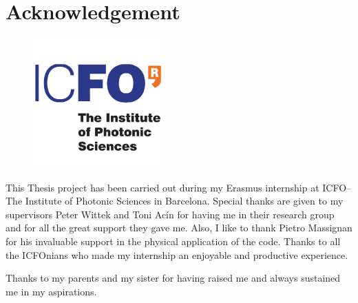 \thispagestyle{empty}
\chapter*{Acknowledgement}

\begin{figure}[h!]
\centering
   \includegraphics[width=5cm]{Figs/logo_icfo.png}
\end{figure}

\noindent This Thesis project has been carried out during my Erasmus internship at ICFO--The Institute of Photonic Sciences in Barcelona. Special thanks are given to my supervisors Peter Wittek and Toni Acín for having me in their research group and for all the great support they gave me.
Also, I like to thank Pietro Massignan for his invaluable support in the physical application of the code.
Thanks to all the ICFOnians who made my internship an enjoyable and productive experience. 

\vspace{1cm}

\noindent Thanks to my parents and my sister for having raised me and always sustained me in my aspirations.